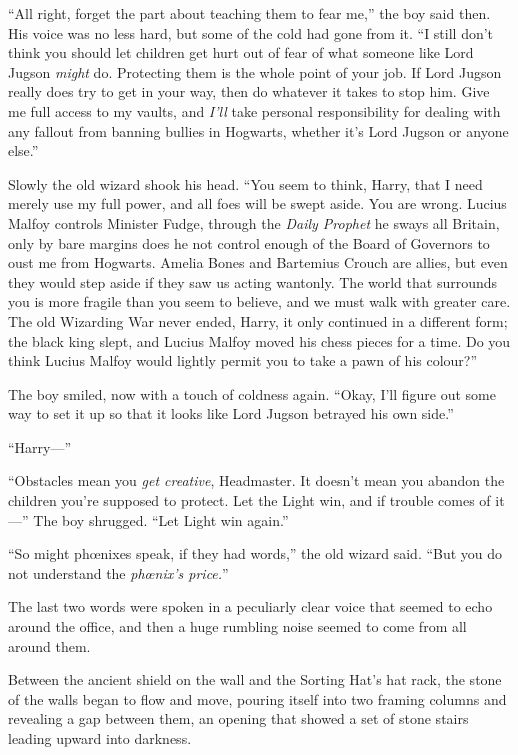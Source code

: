 “All right, forget the part about teaching them to fear me,” the boy said then. His voice was no less hard, but some of the cold had gone from it. “I still don’t think you should let children get hurt out of fear of what someone like Lord Jugson \emph{might} do. Protecting them is the whole point of your job. If Lord Jugson really does try to get in your way, then do whatever it takes to stop him. Give me full access to my vaults, and \emph{I’ll} take personal responsibility for dealing with any fallout from banning bullies in Hogwarts, whether it’s Lord Jugson or anyone else.”

Slowly the old wizard shook his head. “You seem to think, Harry, that I need merely use my full power, and all foes will be swept aside. You are wrong. Lucius Malfoy controls Minister Fudge, through the \emph{Daily Prophet} he sways all Britain, only by bare margins does he not control enough of the Board of Governors to oust me from Hogwarts. Amelia Bones and Bartemius Crouch are allies, but even they would step aside if they saw us acting wantonly. The world that surrounds you is more fragile than you seem to believe, and we must walk with greater care. The old Wizarding War never ended, Harry, it only continued in a different form; the black king slept, and Lucius Malfoy moved his chess pieces for a time. Do you think Lucius Malfoy would lightly permit you to take a pawn of his colour?”

The boy smiled, now with a touch of coldness again. “Okay, I’ll figure out some way to set it up so that it looks like Lord Jugson betrayed his own side.”

“Harry—”

“Obstacles mean you \emph{get creative}, Headmaster. It doesn’t mean you abandon the children you’re supposed to protect. Let the Light win, and if trouble comes of it—” The boy shrugged. “Let Light win again.”

“So might phœnixes speak, if they had words,” the old wizard said. “But you do not understand the \emph{phœnix’s price.}”

The last two words were spoken in a peculiarly clear voice that seemed to echo around the office, and then a huge rumbling noise seemed to come from all around them.

Between the ancient shield on the wall and the Sorting Hat’s hat rack, the stone of the walls began to flow and move, pouring itself into two framing columns and revealing a gap between them, an opening that showed a set of stone stairs leading upward into darkness.

